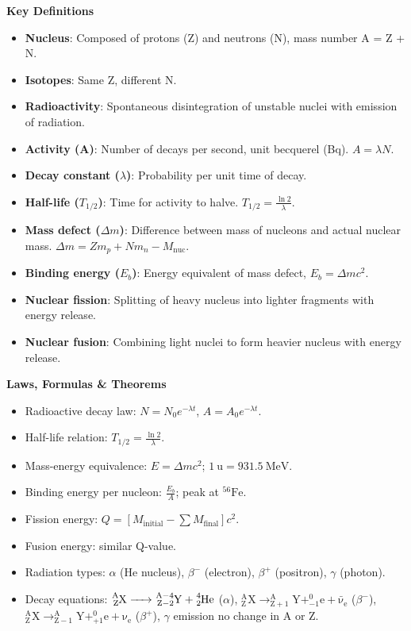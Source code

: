 \documentclass[11pt]{article}
\begin{document}
\begin{bilan}
\textbf{Key Definitions}\par
\begin{itemize}
\item \textbf{Nucleus}: Composed of protons (Z) and neutrons (N), mass number A = Z + N.
\item \textbf{Isotopes}: Same Z, different N.
\item \textbf{Radioactivity}: Spontaneous disintegration of unstable nuclei with emission of radiation.
\item \textbf{Activity (A)}: Number of decays per second, unit becquerel (Bq). $A = \lambda N$.
\item \textbf{Decay constant ($\lambda$)}: Probability per unit time of decay.
\item \textbf{Half-life ($T_{1/2}$)}: Time for activity to halve. $T_{1/2} = \frac{\ln 2}{\lambda}$.
\item \textbf{Mass defect ($\Delta m$)}: Difference between mass of nucleons and actual nuclear mass. $\Delta m = Zm_p + Nm_n - M_{\text{nuc}}$.
\item \textbf{Binding energy ($E_b$)}: Energy equivalent of mass defect, $E_b = \Delta m c^2$.
\item \textbf{Nuclear fission}: Splitting of heavy nucleus into lighter fragments with energy release.
\item \textbf{Nuclear fusion}: Combining light nuclei to form heavier nucleus with energy release.
\end{itemize}

\textbf{Laws, Formulas \& Theorems}\par
\begin{itemize}
\item Radioactive decay law: $N = N_0 e^{-\lambda t}$, $A = A_0 e^{-\lambda t}$.
\item Half-life relation: $T_{1/2} = \frac{\ln 2}{\lambda}$.
\item Mass-energy equivalence: $E = \Delta m c^2$; $1\ \mathrm{u} = 931.5\ \mathrm{MeV}$.
\item Binding energy per nucleon: $\frac{E_b}{A}$; peak at $^{56}\mathrm{Fe}$.
\item Fission energy: $Q = [M_{\text{initial}} - \sum M_{\text{final}}]c^2$.
\item Fusion energy: similar Q-value.
\item Radiation types: $\alpha$ (He nucleus), $\beta^-$ (electron), $\beta^+$ (positron), $\gamma$ (photon).
\item Decay equations: $\ce{^{A}_{Z}X -> ^{A-4}_{Z-2}Y + ^{4}_{2}He}$ ($\alpha$), $\ensuremath{\mathrm{^{A}_{Z}X \rightarrow  ^{A}_{Z+1}Y + ^{0}_{-1}e + \bar{\nu}_e}}$ ($\beta^-$), $\ensuremath{\mathrm{^{A}_{Z}X \rightarrow  ^{A}_{Z-1}Y + ^{0}_{+1}e + \nu_e}}$ ($\beta^+$), $\gamma$ emission no change in A or Z.
\end{itemize}


\end{bilan}
\end{document}
